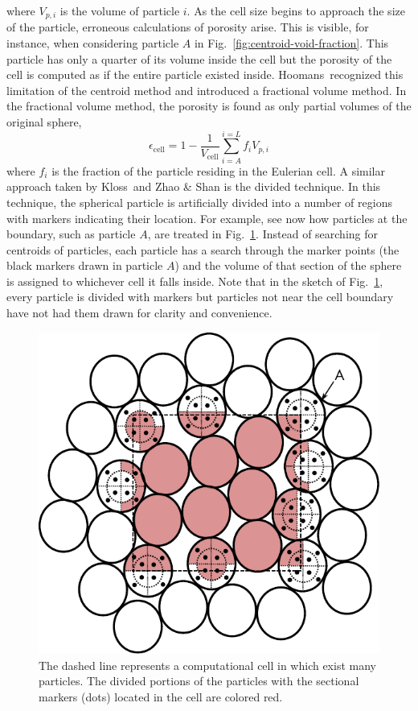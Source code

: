 where $V_{p,i}$ is the volume of particle $i$. As the cell size begins to approach the size of the particle, erroneous calculations of porosity arise. This is visible, for instance, when considering particle $A$ in Fig.~\ref{fig:centroid-void-fraction}. This particle has only a quarter of its volume inside the cell but the porosity of the cell is computed as if the entire particle existed inside. Hoomans\etal~recognized this limitation of the centroid method and introduced a fractional volume method.\cite{Hoomans1996} In the fractional volume method, the porosity is found as only partial volumes of the original sphere,
\begin{equation}
	\epsilon_\text{cell} = 1-\frac{1}{V_\text{cell}}\sum_{i = A}^{i=L}f_iV_{p,i}
\end{equation}
where $f_i$ is the fraction of the particle residing in the Eulerian cell. A similar approach taken by Kloss\etal~and Zhao \& Shan is the divided technique.\cite{Kloss2012,Zhao2013a} In this technique, the spherical particle is artificially divided into a number of regions with markers indicating their location. For example, see now how particles at the boundary, such as particle $A$, are treated in Fig.~\ref{fig:centroid-void-fraction-divided}. Instead of searching for centroids of particles, each particle has a search through the marker points (the black markers drawn in particle $A$) and the volume of that section of the sphere is assigned to whichever cell it falls inside. Note that in the sketch of Fig.~\ref{fig:centroid-void-fraction-divided}, every particle is divided with markers but particles not near the cell boundary have not had them drawn for clarity and convenience.
\begin{figure}[t]
	\centering
	\includegraphics[width=\singleimagewidth]{figures/void-fraction-divided-cell.pdf}
	\caption{The dashed line represents a computational cell in which exist many particles. The divided portions of the particles with the sectional markers (dots) located in the cell are colored red.}\label{fig:centroid-void-fraction-divided}
\end{figure}

